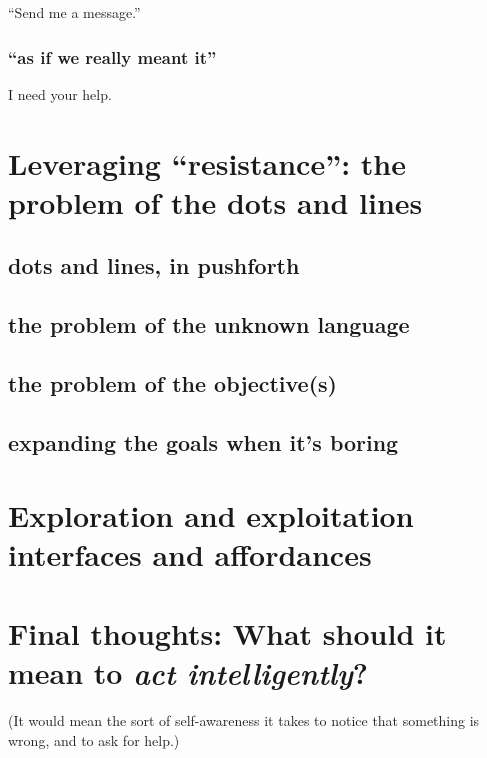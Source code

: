``Send me a message.''

\subsubsection{``as if we really meant it''}\hypertarget{as-if-we-really-meant-it}{}\label{as-if-we-really-meant-it}

I need your help.

\section{Leveraging ``resistance'': the problem of the dots and lines}\hypertarget{leveraging-resistance-the-problem-of-the-dots-and-lines}{}\label{leveraging-resistance-the-problem-of-the-dots-and-lines}

\subsection{dots and lines, in pushforth}\hypertarget{dots-and-lines-in-pushforth}{}\label{dots-and-lines-in-pushforth}

\subsection{the problem of the unknown language}\hypertarget{the-problem-of-the-unknown-language}{}\label{the-problem-of-the-unknown-language}

\subsection{the problem of the objective(s)}\hypertarget{the-problem-of-the-objectives}{}\label{the-problem-of-the-objectives}

\subsection{expanding the goals when it's boring}\hypertarget{expanding-the-goals-when-its-boring}{}\label{expanding-the-goals-when-its-boring}

\section{Exploration and exploitation interfaces and affordances}\hypertarget{exploration-and-exploitation-interfaces-and-affordances}{}\label{exploration-and-exploitation-interfaces-and-affordances}

\section{Final thoughts: What should it mean to \emph{act intelligently}?}\hypertarget{final-thoughts-what-should-it-mean-to-act-intelligently}{}\label{final-thoughts-what-should-it-mean-to-act-intelligently}

(It would mean the sort of self-awareness it takes to notice that something is wrong, and to ask for help.)

